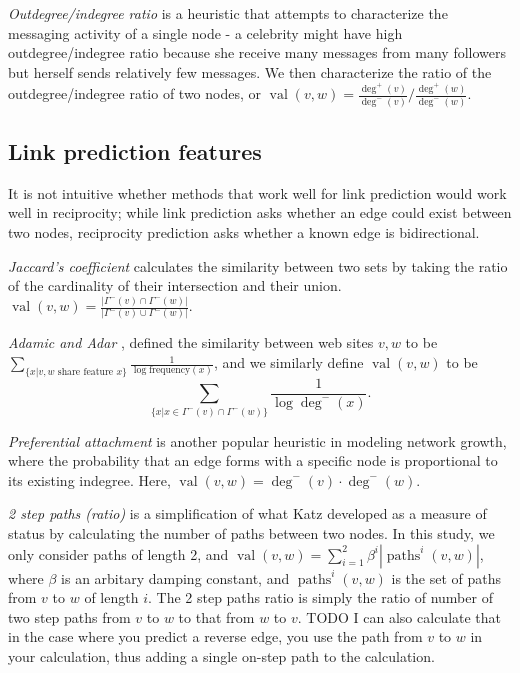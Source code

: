 \documentclass[conference]{IEEEtran}
\begin{document}
\emph{Outdegree/indegree ratio} is a heuristic that attempts to characterize the messaging activity of a single node - a celebrity might have high outdegree/indegree ratio because she receive many messages from many followers but herself sends relatively few messages. We then characterize the ratio of the outdegree/indegree ratio of two nodes, or $\operatorname{val}(v,w) = \frac{\deg^+(v)}{\deg^-(v)} / \frac{\deg^+(w)}{\deg^-(w)}$.

\subsection{Link prediction features}
It is not intuitive whether methods that work well for link prediction would work well in reciprocity; while link prediction asks whether an edge could exist between two nodes, reciprocity prediction asks whether a known edge is bidirectional.

\emph{Jaccard's coefficient} calculates the similarity between two sets by taking the ratio of the cardinality of their intersection and their union. $\operatorname{val}(v,w) = \frac{|\Gamma^-(v) \cap \Gamma^-(w)|}{|\Gamma^-(v) \cup \Gamma^-(w)|}$.

\emph{Adamic and Adar} \cite{Adamic:2003ud}, defined the similarity between web sites $v,w$ to be $ \sum_{\{x|v,w \text{ share feature }x\}} \frac{1}{\log{\text{frequency}(x)}} $, and we similarly define $\operatorname{val}(v,w)$ to be \[ \sum_{\{x|x \in \Gamma^-(v) \cap \Gamma^-(w)\}} \frac{1}{\log{\deg^-(x)}} .\]

\emph{Preferential attachment} is another popular heuristic in modeling network growth, where the probability that an edge forms with a specific node is proportional to its existing indegree. Here, $\operatorname{val}(v,w) = \deg^-(v)\cdot \deg^-(w)$.

\emph{2 step paths (ratio)} is a simplification of what Katz \cite{Katz:1953un} developed as a measure of status by calculating the number of paths between two nodes. In this study, we only consider paths of length 2, and $\operatorname{val}(v,w) = \sum_{i=1}^2 \beta^i|\operatorname{paths}^i(v,w)|$, where $\beta$ is an arbitary damping constant, and $\operatorname{paths}^i(v,w)$ is the set of paths from $v$ to $w$ of length $i$. The 2 step paths ratio is simply the ratio of number of two step paths from $v$ to $w$ to that from $w$ to $v$. TODO I can also calculate that in the case where you predict a reverse edge, you use the path from $v$ to $w$ in your calculation, thus adding a single on-step path to the calculation.
\end{document}
